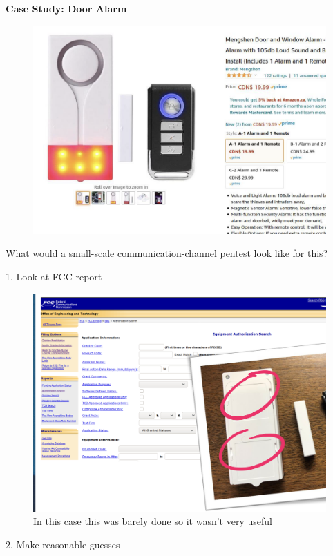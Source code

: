 \documentclass[../notes.tex]{subfiles}
\begin{document}
\begin{blockquote}
    \textbf{Case Study: Door Alarm} 
    \begin{figure}[H]
        \centering
        \includegraphics[width=0.8\linewidth]{img/image_2023-01-30-18-43-35.png}
    \end{figure}

    What would a small-scale communication-channel pentest look like for this?


    1. Look at FCC report

    \begin{figure}[H]
        \centering
        \includegraphics[width=0.8\linewidth]{img/image_2023-01-30-18-45-35.png}
        \caption{In this case this was barely done so it wasn't very useful}
    \end{figure}

    2. Make reasonable guesses


\end{blockquote}
\end{document}
